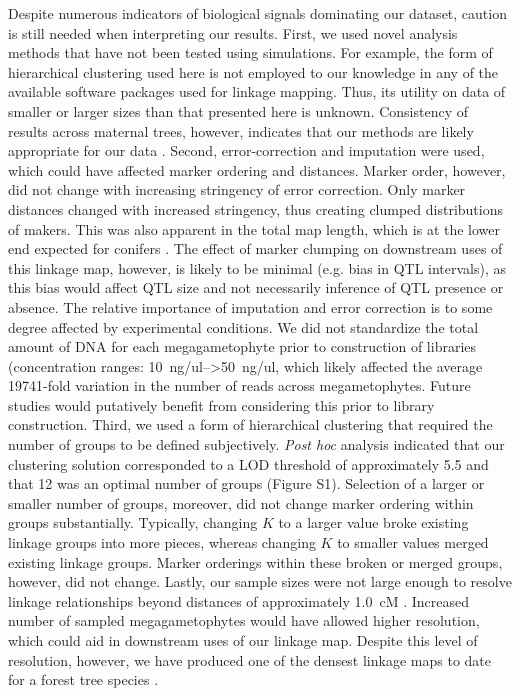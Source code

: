 \documentclass[smallextended]{svjour3}
\begin{document}
Despite numerous indicators of biological signals dominating our dataset, 
caution is still needed when interpreting our results. First, we used novel analysis
methods that have not been tested using simulations. For example, the form of
hierarchical clustering used here is not employed to our knowledge in any of the
available software packages used for linkage mapping. Thus, its utility on data
of smaller or larger sizes than that presented here is unknown. Consistency of
results across maternal trees, however, indicates that our methods are likely
appropriate for our data \citep[see also][]{Tani:2003}. Second, error-correction
and imputation were used, which could have affected marker ordering and
distances. Marker order, however, did not change with increasing stringency of
error correction. Only marker distances changed with increased stringency, thus
creating clumped distributions of makers. This was also apparent in the total
map length, which is at the lower end expected for conifers
\citep[cf.,][]{Ritland:2011}. The effect of marker clumping on downstream uses
of this linkage map, however, is likely to be minimal (e.g. bias in QTL
intervals), as this bias would affect QTL size and not necessarily inference of
QTL presence or absence. The relative importance of imputation and error
correction is to some degree affected by experimental conditions.  We did
not standardize the total amount of DNA for each megagametophyte prior to
construction of libraries (concentration ranges: \SIrange{10}{>50}{ng/ul},
which likely affected the average \num{19741}-fold variation in the number of reads
across megametophytes. Future studies would putatively benefit from considering
this prior to library construction. Third, we used a form of hierarchical
clustering that required the number of groups to be defined
subjectively. \textit{Post hoc} analysis indicated that our clustering solution
corresponded to a LOD threshold of approximately 5.5 and that 12 was an
optimal number of groups (Figure S1). Selection of a larger or smaller number of
groups, moreover, did not change marker ordering within groups substantially.
Typically, changing $K$ to a larger value broke existing linkage groups
into more pieces, whereas changing $K$ to smaller values merged existing linkage
groups. Marker orderings within these broken or merged groups, however, did not
change.  Lastly, our sample sizes were not large enough to resolve linkage
relationships beyond distances of approximately \SI{1.0}{cM} \citep[but
see][]{Neves:2014}. Increased number of sampled megagametophytes would have
allowed higher resolution, which could aid in downstream uses of our linkage
map. Despite this level of resolution, however, we have produced one of the
densest linkage maps to date for a forest tree species \citep{Eckert:2010b,
  Martinez-Garcia:2013, Neves:2014}.
\end{document}
